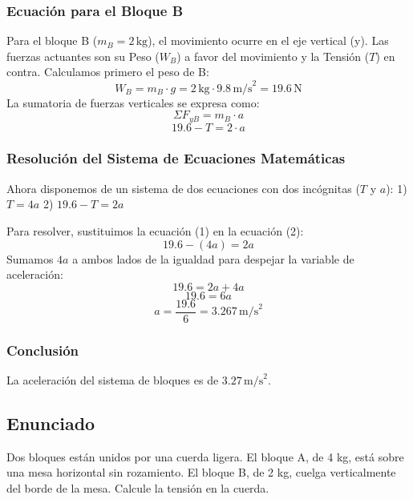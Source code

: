 \documentclass[12pt]{article}
\begin{document}
\subsubsection*{Ecuación para el Bloque B}
Para el bloque B ($m_B = 2 \, \text{kg}$), el movimiento ocurre en el eje vertical (y). Las fuerzas actuantes son su Peso ($W_B$) a favor del movimiento y la Tensión ($T$) en contra. Calculamos primero el peso de B:
\begin{equation}
    W_B = m_B \cdot g = 2 \, \text{kg} \cdot 9.8 \, \text{m/s}^2 = 19.6 \, \text{N}
\end{equation}
La sumatoria de fuerzas verticales se expresa como:
\begin{equation}
    \Sigma F_{yB} = m_B \cdot a
\end{equation}
\begin{equation}
    19.6 - T = 2 \cdot a
\end{equation}

\subsubsection*{Resolución del Sistema de Ecuaciones Matemáticas}
Ahora disponemos de un sistema de dos ecuaciones con dos incógnitas ($T$ y $a$):
1) $T = 4a$
2) $19.6 - T = 2a$

Para resolver, sustituimos la ecuación (1) en la ecuación (2):
\begin{equation}
    19.6 - (4a) = 2a
\end{equation}
Sumamos $4a$ a ambos lados de la igualdad para despejar la variable de aceleración:
\begin{equation}
    19.6 = 2a + 4a
\end{equation}
\begin{equation}
    19.6 = 6a
\end{equation}
\begin{equation}
    a = \frac{19.6}{6} = 3.267 \, \text{m/s}^2
\end{equation}

\subsubsection*{Conclusión}
La aceleración del sistema de bloques es de $3.27 \, \text{m/s}^2$.

\newpage

\subsection*{Enunciado}
Dos bloques están unidos por una cuerda ligera. El bloque A, de 4 kg, está sobre una mesa horizontal sin rozamiento. El bloque B, de 2 kg, cuelga verticalmente del borde de la mesa. Calcule la tensión en la cuerda.
\end{document}
